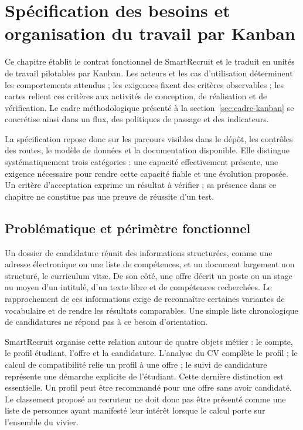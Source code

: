\chapter{Spécification des besoins et organisation du travail par Kanban}
\label{chap:besoins}

Ce chapitre établit le contrat fonctionnel de SmartRecruit et le traduit en unités de travail pilotables par Kanban. Les acteurs et les cas d'utilisation déterminent les comportements attendus ; les exigences fixent des critères observables ; les cartes relient ces critères aux activités de conception, de réalisation et de vérification. Le cadre méthodologique présenté à la section~\ref{sec:cadre-kanban} se concrétise ainsi dans un flux, des politiques de passage et des indicateurs.

La spécification repose donc sur les parcours visibles dans le dépôt, les contrôles des routes, le modèle de données et la documentation disponible. Elle distingue systématiquement trois catégories : une capacité effectivement présente, une exigence nécessaire pour rendre cette capacité fiable et une évolution proposée. Un critère d'acceptation exprime un résultat à vérifier ; sa présence dans ce chapitre ne constitue pas une preuve de réussite d'un test.

\section{Problématique et périmètre fonctionnel}

Un dossier de candidature réunit des informations structurées, comme une adresse électronique ou une liste de compétences, et un document largement non structuré, le curriculum vitæ. De son côté, une offre décrit un poste ou un stage au moyen d'un intitulé, d'un texte libre et de compétences recherchées. Le rapprochement de ces informations exige de reconnaître certaines variantes de vocabulaire et de rendre les résultats comparables. Une simple liste chronologique de candidatures ne répond pas à ce besoin d'orientation.

SmartRecruit organise cette relation autour de quatre objets métier : le compte, le profil étudiant, l'offre et la candidature. L'analyse du CV complète le profil ; le calcul de compatibilité relie un profil à une offre ; le suivi de candidature représente une démarche explicite de l'étudiant. Cette dernière distinction est essentielle. Un profil peut être recommandé pour une offre sans avoir candidaté. Le classement proposé au recruteur ne doit donc pas être présenté comme une liste de personnes ayant manifesté leur intérêt lorsque le calcul porte sur l'ensemble du vivier.

